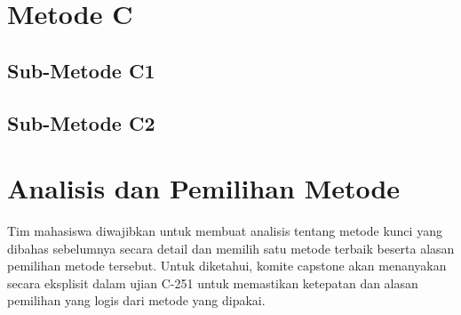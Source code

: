     \lipsum[7-9]

\section{Metode C}
\label{sec:Metode_03}

    \lipsum[10-12]
    
    \subsection{Sub-Metode C1}
    \label{subsec:Sub-Metode_03A}
    
    \lipsum[13-15]
    
    \subsection{Sub-Metode C2}
    \label{subsec:Sub-Metode_03B}
    
    \lipsum[15-17]

\section{Analisis dan Pemilihan Metode}
\label{sec:Analisis dan Pemilihan Metode}

Tim mahasiswa diwajibkan untuk membuat analisis tentang metode kunci yang dibahas sebelumnya secara detail dan memilih satu metode terbaik beserta alasan pemilihan metode tersebut. Untuk diketahui, komite capstone akan menanyakan secara eksplisit dalam ujian C-251 untuk memastikan ketepatan dan alasan pemilihan yang logis dari metode yang dipakai.